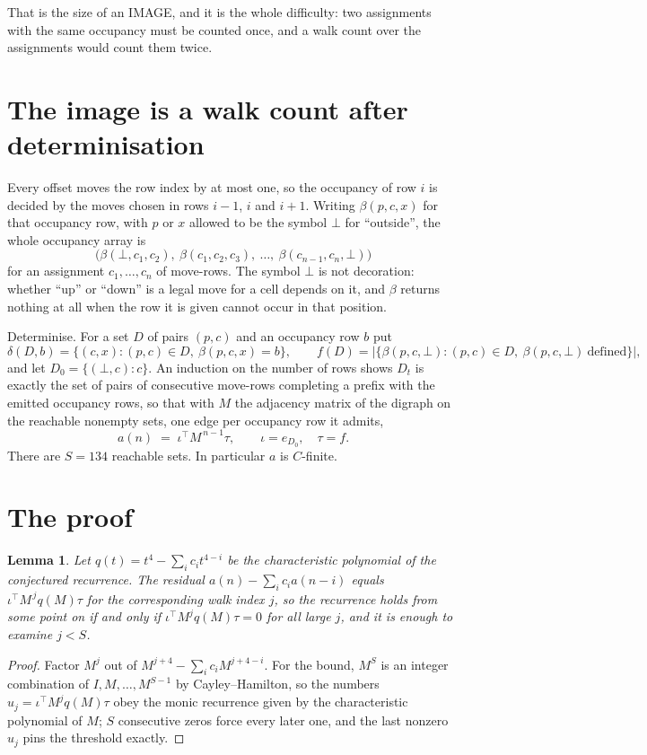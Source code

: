\documentclass[11pt,a4paper]{article}
\theoremstyle{plain}
\newtheorem{lemma}[theorem]{Lemma}
\theoremstyle{definition}
\begin{document}
That is the size of an IMAGE, and it is the whole difficulty: two assignments with the same
occupancy must be counted once, and a walk count over the assignments would count them twice.

\section{The image is a walk count after determinisation}

Every offset moves the row index by at most one, so the occupancy of row $i$ is decided by the
moves chosen in rows $i-1$, $i$ and $i+1$. Writing $\beta(p,c,x)$ for that occupancy row, with
$p$ or $x$ allowed to be the symbol $\bot$ for ``outside'', the whole occupancy array is
\[
\bigl(\beta(\bot,c_1,c_2),\ \beta(c_1,c_2,c_3),\ \dots,\ \beta(c_{n-1},c_n,\bot)\bigr)
\]
for an assignment $c_1,\dots,c_n$ of move-rows. The symbol $\bot$ is not decoration: whether
``up'' or ``down'' is a legal move for a cell depends on it, and $\beta$ returns nothing at all
when the row it is given cannot occur in that position.

Determinise. For a set $D$ of pairs $(p,c)$ and an occupancy row $b$ put
\[
\delta(D,b)=\{(c,x):(p,c)\in D,\ \beta(p,c,x)=b\},\qquad
f(D)=\bigl|\{\beta(p,c,\bot):(p,c)\in D,\ \beta(p,c,\bot)\ \text{defined}\}\bigr| ,
\]
and let $D_0=\{(\bot,c):c\}$. An induction on the number of rows shows $D_t$ is exactly the
set of pairs of consecutive move-rows completing a prefix with the emitted occupancy rows, so
that with $M$ the adjacency matrix of the digraph on the reachable nonempty sets, one edge per
occupancy row it admits,
\[
a(n)\;=\;\iota^{\!\top}M^{\,n-1}\tau,\qquad \iota=e_{D_0},\quad \tau=f .
\]
There are $S=134$ reachable sets. In particular $a$ is $C$-finite.

\section{The proof}

\begin{lemma}\label{lem:crit}
Let $q(t)=t^{4}-\sum_i c_it^{4-i}$ be the characteristic polynomial of the
conjectured recurrence. The residual $a(n)-\sum_ic_ia(n-i)$ equals
$\iota^{\!\top}M^{\,j}q(M)\tau$ for the corresponding walk index $j$, so the recurrence
holds from some point on if and only if $\iota^{\!\top}M^{j}q(M)\tau=0$ for all large $j$,
and it is enough to examine $j<S$.
\end{lemma}

\begin{proof}
Factor $M^{j}$ out of $M^{j+4}-\sum_ic_iM^{j+4-i}$. For the bound, $M^{S}$
is an integer combination of $I,M,\dots,M^{S-1}$ by Cayley--Hamilton, so the numbers
$u_j=\iota^{\!\top}M^{j}q(M)\tau$ obey the monic recurrence given by the characteristic
polynomial of $M$; $S$ consecutive zeros force every later one, and the last nonzero $u_j$
pins the threshold exactly.
\end{proof}
\end{document}
